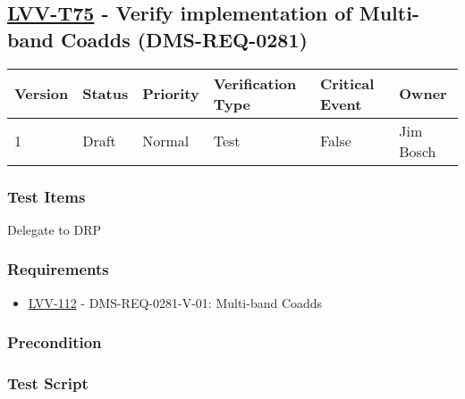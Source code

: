 \hypertarget{lvv-t75---verify-implementation-of-multi-band-coadds-dms-req-0281}{%
\subsection{\texorpdfstring{\href{https://jira.lsstcorp.org/secure/Tests.jspa\#/testCase/LVV-T75}{LVV-T75}
- Verify implementation of Multi-band Coadds
(DMS-REQ-0281)}{LVV-T75 - Verify implementation of Multi-band Coadds (DMS-REQ-0281)}}\label{lvv-t75---verify-implementation-of-multi-band-coadds-dms-req-0281}}

\begin{longtable}[]{@{}llllll@{}}
\toprule
Version & Status & Priority & Verification Type & Critical Event &
Owner\tabularnewline
\midrule
\endhead
1 & Draft & Normal & Test & False & Jim Bosch\tabularnewline
\bottomrule
\end{longtable}

\hypertarget{test-items-164}{%
\subsubsection{Test Items}\label{test-items-164}}

Delegate to DRP

\hypertarget{requirements-165}{%
\subsubsection{Requirements}\label{requirements-165}}

\begin{itemize}
\tightlist
\item
  \href{https://jira.lsstcorp.org/browse/LVV-112}{LVV-112} -
  DMS-REQ-0281-V-01: Multi-band Coadds
\end{itemize}

\hypertarget{precondition-6}{%
\subsubsection{Precondition}\label{precondition-6}}

\hypertarget{test-script-165}{%
\subsubsection{Test Script}\label{test-script-165}}


